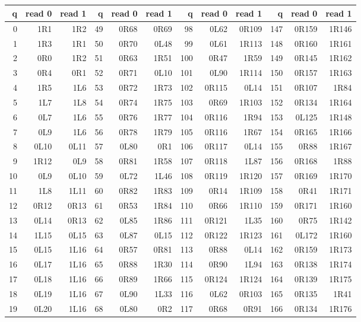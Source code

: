 \subsection{\texorpdfstring{}{PA194JH5X\_MF}}
\begingroup\fontsize{8.4}{9.6}\selectfont\ttfamily
\setlength{\tabcolsep}{4pt}\renewcommand{\arraystretch}{1.0}
\begin{center}\begin{tabular}{rrr@{\hspace{13pt}}rrr@{\hspace{13pt}}rrr@{\hspace{13pt}}rrr}
\toprule q&read 0&read 1&q&read 0&read 1&q&read 0&read 1&q&read 0&read 1\\\midrule
0&1R1&1R2&49&0R68&0R69&98&0L62&0R109&147&0R159&1R146\\
1&1R3&1R1&50&0R70&0L48&99&0L61&1R113&148&0R160&1R161\\
2&0R0&1R2&51&0R63&1R51&100&0R47&1R59&149&0R145&1R162\\
3&0R4&0R1&52&0R71&0L10&101&0L90&1R114&150&0R157&1R163\\
4&1R5&1L6&53&0R72&1R73&102&0R115&0L14&151&0R107&1R84\\
5&1L7&1L8&54&0R74&1R75&103&0R69&1R103&152&0R134&1R164\\
6&0L7&1L6&55&0R76&1R77&104&0R116&1R94&153&0L125&1R148\\
7&0L9&1L6&56&0R78&1R79&105&0R116&1R67&154&0R165&1R166\\
8&0L10&0L11&57&0L80&0R1&106&0R117&0L14&155&0R88&1R167\\
9&1R12&0L9&58&0R81&1R58&107&0R118&1L87&156&0R168&1R88\\
10&0L9&0L10&59&0L72&1L46&108&0R119&1R120&157&0R169&1R170\\
11&1L8&1L11&60&0R82&1R83&109&0R14&1R109&158&0R41&1R171\\
12&0R12&0R13&61&0R53&1R84&110&0R66&1R110&159&0R171&1R160\\
13&0L14&0R13&62&0L85&1R86&111&0R121&1L35&160&0R75&1R142\\
14&1L15&0L15&63&0L87&0L15&112&0R122&1R123&161&0L172&1R160\\
15&0L15&1L16&64&0R57&0R81&113&0R88&0L14&162&0R159&1R173\\
16&0L17&1L16&65&0R88&1R30&114&0R90&1L94&163&0R138&1R174\\
17&0L18&1L16&66&0R89&1R66&115&0R124&1R124&164&0R139&1R175\\
18&0L19&1L16&67&0L90&1L33&116&0L62&0R103&165&0R135&1R41\\
19&0L20&1L16&68&0L80&0R2&117&0R68&0R91&166&0R134&1R176\\

\end{tabular}
\end{center}
